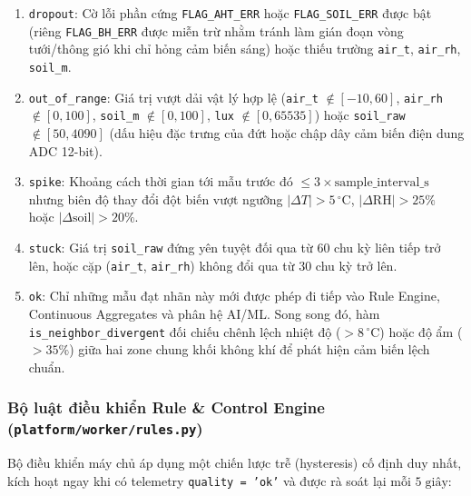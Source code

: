 \begin{enumerate}[leftmargin=*]
    \item \texttt{dropout}: Cờ lỗi phần cứng \texttt{FLAG\_AHT\_ERR} hoặc \texttt{FLAG\_SOIL\_ERR} được bật (riêng \texttt{FLAG\_BH\_ERR} được miễn trừ nhằm tránh làm gián đoạn vòng tưới/thông gió khi chỉ hỏng cảm biến sáng) hoặc thiếu trường \texttt{air\_t}, \texttt{air\_rh}, \texttt{soil\_m}.
    \item \texttt{out\_of\_range}: Giá trị vượt dải vật lý hợp lệ (\texttt{air\_t} \(\notin [-10, 60]\), \texttt{air\_rh} \(\notin [0, 100]\), \texttt{soil\_m} \(\notin [0, 100]\), \texttt{lux} \(\notin [0, 65535]\)) hoặc \texttt{soil\_raw} \(\notin [50, 4090]\) (dấu hiệu đặc trưng của đứt hoặc chập dây cảm biến điện dung ADC 12-bit).
    \item \texttt{spike}: Khoảng cách thời gian tới mẫu trước đó \(\le 3 \times \text{sample\_interval\_s}\) nhưng biên độ thay đổi đột biến vượt ngưỡng \(|\Delta T| > 5\,^\circ\text{C}\), \(|\Delta \text{RH}| > 25\%\) hoặc \(|\Delta \text{soil}| > 20\%\).
    \item \texttt{stuck}: Giá trị \texttt{soil\_raw} đứng yên tuyệt đối qua từ \(60\) chu kỳ liên tiếp trở lên, hoặc cặp (\texttt{air\_t}, \texttt{air\_rh}) không đổi qua từ \(30\) chu kỳ trở lên.
    \item \texttt{ok}: Chỉ những mẫu đạt nhãn này mới được phép đi tiếp vào Rule Engine, Continuous Aggregates và phân hệ AI/ML. Song song đó, hàm \texttt{is\_neighbor\_divergent} đối chiếu chênh lệch nhiệt độ (\(> 8\,^\circ\text{C}\)) hoặc độ ẩm (\(> 35\%\)) giữa hai zone chung khối không khí để phát hiện cảm biến lệch chuẩn.
\end{enumerate}

\subsubsection{Bộ luật điều khiển Rule \& Control Engine (\texttt{platform/worker/rules.py})}

Bộ điều khiển máy chủ áp dụng một chiến lược trễ (hysteresis) cố định duy nhất, kích hoạt ngay khi có telemetry \texttt{quality = 'ok'} và được rà soát lại mỗi \(5\;\text{giây}\):

